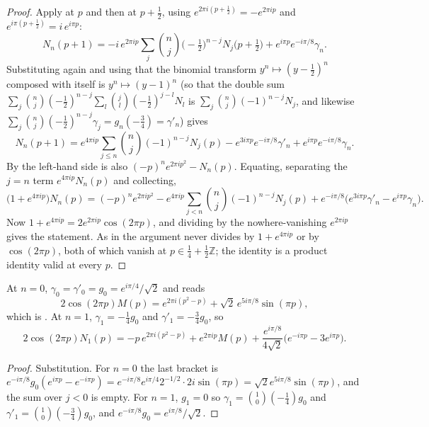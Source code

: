 \begin{proof}
Apply  at $p$ and then at $p+\tfrac12$, using
$e^{2\pi i(p+\frac12)}=-e^{2\pi ip}$ and $e^{i\pi(p+\frac12)}=i\,e^{i\pi p}$:
\[
  N_{n}(p+1)=-i\,e^{2\pi ip}\sum_{j}\binom nj\bigl(-\tfrac12\bigr)^{n-j}N_{j}\bigl(p+\tfrac12\bigr)
    +e^{i\pi p}e^{-i\pi/8}\gamma_{n}.
\]
Substituting  again and using that the binomial transform
$y^{n}\mapsto(y-\tfrac12)^{n}$ composed with itself is $y^{n}\mapsto(y-1)^{n}$ (so that the
double sum $\sum_{j}\binom nj(-\tfrac12)^{n-j}\sum_{l}\binom jl(-\tfrac12)^{j-l}N_{l}$ is
$\sum_{j}\binom nj(-1)^{n-j}N_{j}$, and likewise
$\sum_{j}\binom nj(-\tfrac12)^{n-j}\gamma_{j}=g_{n}(-\tfrac34)=\gamma'_{n}$) gives
\[
  N_{n}(p+1)=e^{4\pi ip}\sum_{j\le n}\binom nj(-1)^{n-j}N_{j}(p)
   -e^{3i\pi p}e^{-i\pi/8}\gamma'_{n}+e^{i\pi p}e^{-i\pi/8}\gamma_{n}.
\]
By  the left-hand side is also $(-p)^{n}e^{2\pi ip^{2}}-N_{n}(p)$.
Equating, separating the $j=n$ term $e^{4\pi ip}N_{n}(p)$ and collecting,
\[
  \bigl(1+e^{4\pi ip}\bigr)N_{n}(p)=(-p)^{n}e^{2\pi ip^{2}}
   -e^{4\pi ip}\sum_{j<n}\binom nj(-1)^{n-j}N_{j}(p)
   +e^{-i\pi/8}\bigl(e^{3i\pi p}\gamma'_{n}-e^{i\pi p}\gamma_{n}\bigr).
\]
Now $1+e^{4\pi ip}=2e^{2\pi ip}\cos(2\pi p)$, and dividing by the nowhere-vanishing $e^{2\pi ip}$
gives the statement.  As in  the argument never divides by
$1+e^{4\pi ip}$ or by $\cos(2\pi p)$, both of which vanish at $p\in\tfrac14+\tfrac12\mathbb{Z}$;
the identity is a product identity valid at every $p$.
\end{proof}

\begin{corollary}
\label{cor:rsg_closed_low}
At $n=0$, $\gamma_{0}=\gamma'_{0}=g_{0}=e^{i\pi/4}/\sqrt2$ and  reads
\[
  2\cos(2\pi p)M(p)=e^{2\pi i(p^{2}-p)}+\sqrt2\,e^{5i\pi/8}\sin(\pi p),
\]
which is .  At $n=1$, $\gamma_{1}=-\tfrac14g_{0}$ and
$\gamma'_{1}=-\tfrac34g_{0}$, so
\[
  2\cos(2\pi p)N_{1}(p)=-p\,e^{2\pi i(p^{2}-p)}+e^{2\pi ip}M(p)
   +\frac{e^{i\pi/8}}{4\sqrt2}\bigl(e^{-i\pi p}-3e^{i\pi p}\bigr).
\]
\end{corollary}

\begin{proof}
Substitution.  For $n=0$ the last bracket is
$e^{-i\pi/8}g_{0}(e^{i\pi p}-e^{-i\pi p})
=e^{-i\pi/8}e^{i\pi/4}2^{-1/2}\cdot2i\sin(\pi p)=\sqrt2e^{5i\pi/8}\sin(\pi p)$, and the sum over
$j<0$ is empty.  For $n=1$, $g_{1}=0$ so $\gamma_{1}=\binom10(-\tfrac14)g_{0}$ and
$\gamma'_{1}=\binom10(-\tfrac34)g_{0}$, and $e^{-i\pi/8}g_{0}=e^{i\pi/8}/\sqrt2$.
\end{proof}

